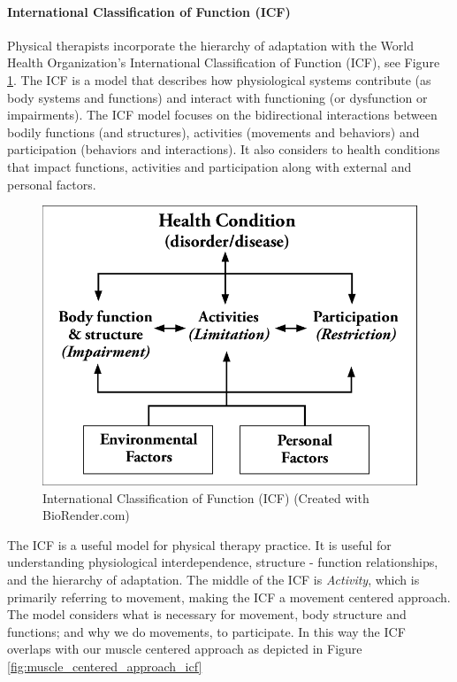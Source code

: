 \paragraph{International Classification of Function (ICF)}
Physical therapists incorporate the hierarchy of adaptation with the World Health Organization's International Classification of Function (ICF), see Figure \ref{fig:icf}. The ICF is a model that describes how physiological systems contribute (as body systems and functions) and interact with functioning (or dysfunction or impairments). The ICF model focuses on the bidirectional interactions between bodily functions (and structures), activities (movements and behaviors) and participation (behaviors and interactions). It also considers to health conditions that impact functions, activities and participation along with external and personal factors. 

\begin{figure}[!ht]
    \centering
    \includegraphics[width=1\linewidth]{./figure/ICF.png}
    \caption{International Classification of Function (ICF) \footnotesize{(Created with BioRender.com)}}
    \label{fig:icf}
\end{figure}

The ICF is a useful model for physical therapy practice. It is useful for understanding physiological interdependence, structure - function relationships, and the hierarchy of adaptation. The middle of the ICF is \textit{Activity}, which is primarily referring to movement, making the ICF a movement centered approach. The model considers what is necessary for movement, body structure and functions; and why we do movements, to participate. In this way the ICF overlaps with our muscle centered approach as depicted in Figure \ref{fig:muscle_centered_approach_icf}

